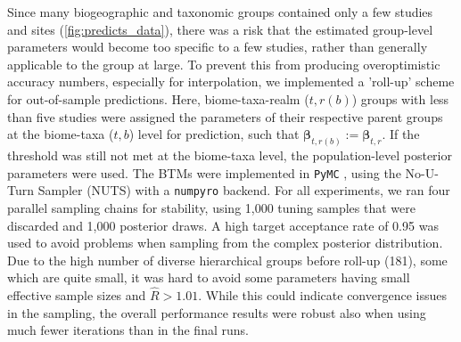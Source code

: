 Since many biogeographic and taxonomic groups contained only a few studies and sites (\autoref{fig:predicts_data}), there was a risk that the estimated group-level parameters would become too specific to a few studies, rather than generally applicable to the group at large. To prevent this from producing overoptimistic accuracy numbers, especially for interpolation, we implemented a 'roll-up' scheme for out-of-sample predictions. Here, biome-taxa-realm ($t,r(b)$) groups with less than five studies were assigned the parameters of their respective parent groups at the biome-taxa ($t,b$) level for prediction, such that $\boldsymbol{\beta}_{t,r(b)} := \boldsymbol{\beta}_{t,r}$. If the threshold was still not met at the biome-taxa level, the population-level posterior parameters were used. The BTMs were implemented in \texttt{PyMC} \cite{abril-pla2023}, using the No-U-Turn Sampler (NUTS)\cite{hoffman2014} with a \texttt{numpyro}\cite{phan2019} backend. For all experiments, we ran four parallel sampling chains for stability, using 1,000 tuning samples that were discarded and 1,000 posterior draws. A high target acceptance rate of 0.95 was used to avoid problems when sampling from the complex posterior distribution. Due to the high number of diverse hierarchical groups before roll-up (181), some which are quite small, it was hard to avoid some parameters having small effective sample sizes and $\widehat{R}>1.01$\cite{vehtari2019}. While this could indicate convergence issues in the sampling, the overall performance results were robust also when using much fewer iterations than in the final runs.

\vspace{\baselineskip}
